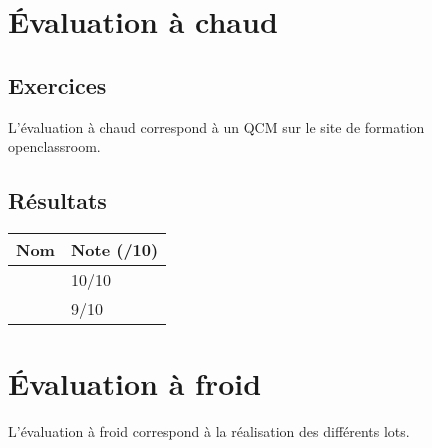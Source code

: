 \documentclass[asi, sansVersion]{picInsa}
\begin{document}
	\newpage
	\section*{Évaluation à chaud}
		\subsection*{Exercices}
		L'évaluation à chaud correspond à un QCM sur le site de formation openclassroom.

			
		\subsection*{Résultats}
			\begin{longtable}{|p{0.5\textwidth}|p{}|}
				\hline
					\rowcolor[gray]{0.90} Nom & Note (/10) \\
				\hline
					\Mathieu &  10/10\\
				\hline
					\Julie &  9/10\\
				\hline
			
			\end{longtable}
			
	\newpage
	\section*{Évaluation à froid}
		L'évaluation à froid correspond à la réalisation des différents lots.
\end{document}
